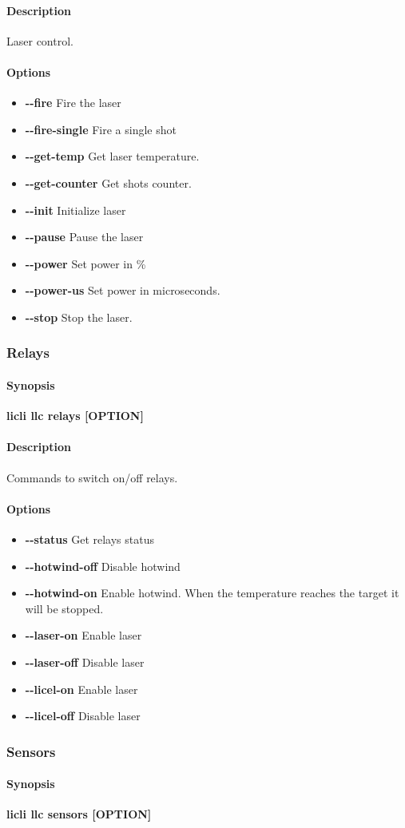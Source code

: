\documentclass[letterpaper, 10 pt]{article}
\newcommand{\cmdsection}[1]{\paragraph{#1}\mbox{}\par}
\begin{document}
\cmdsection{Description} Laser control.\\
\cmdsection{Options}
\begin{itemize}
	\item[] \textbf{-{}-fire} Fire the laser
	\item[] \textbf{-{}-fire-single} Fire a single shot
	\item[] \textbf{-{}-get-temp} Get laser temperature.
	\item[] \textbf{-{}-get-counter} Get shots counter.
	\item[] \textbf{-{}-init} Initialize laser
	\item[] \textbf{-{}-pause} Pause the laser
	\item[] \textbf{-{}-power} Set power in \%
	\item[] \textbf{-{}-power-us} Set power in microseconds.
	\item[] \textbf{-{}-stop} Stop the laser.
\end{itemize}

\subsubsection{Relays}
\cmdsection{Synopsis} \textbf{licli llc relays [OPTION]}\\

\cmdsection{Description} Commands to switch on/off relays.\\
\cmdsection{Options}
\begin{itemize}
	\item[] \textbf{-{}-status} Get relays status
	\item[] \textbf{-{}-hotwind-off} Disable hotwind
	\item[] \textbf{-{}-hotwind-on} Enable hotwind. When the temperature reaches the target it will be stopped.
	\item[] \textbf{-{}-laser-on} Enable laser
	\item[] \textbf{-{}-laser-off} Disable laser
	\item[] \textbf{-{}-licel-on} Enable laser
	\item[] \textbf{-{}-licel-off} Disable laser
\end{itemize}

\subsubsection{Sensors}
\cmdsection{Synopsis} \textbf{licli llc sensors [OPTION]}\\
\end{document}
